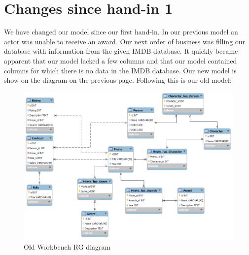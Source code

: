 \section{Changes since hand-in 1}
We have changed our model since our first hand-in. In our previous model an actor was unable to receive an award.
Our next order of business was filling our database with information from the given IMDB database. It quickly became apparent that our model lacked a few columns and that our model contained columns for which there is no data in the IMDB database.
Our new model is show on the diagram on the previous page. Following this is our old model:
\begin{figure}[h!]
\includegraphics[width=\textwidth,natwidth=940,natheight=670]{illustrations/OldRG.png}
  \caption{Old Workbench RG diagram}
\end{figure}
\newpage
